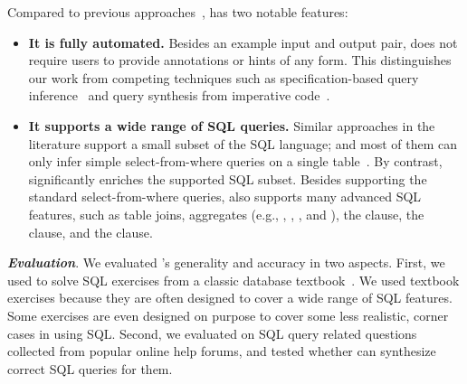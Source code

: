 Compared to previous approaches~\cite{Zloof:1975,
Tran:2009, DasSarma:2010, abs-1208-2013}, \ourtool has two notable features:

\begin{itemize}
\item \textbf{It is fully automated.} Besides
an example input and output pair,
\ourtool does not require users to provide
annotations or hints of any form. 
This distinguishes our work from competing techniques such as
specification-based query inference~\cite{Zloof:1975} and
query synthesis from imperative code~\cite{abs-1208-2013}.

\item \textbf{It supports a wide range of SQL queries.}
Similar approaches in the literature support
a small subset of the SQL language; and most of them
can only infer simple select-from-where
queries on a single table~\cite{Zloof:1975, DasSarma:2010, Tran:2009, DasSarma:2010, abs-1208-2013}. By contrast, 
\ourtool significantly enriches the supported SQL subset.
Besides supporting the standard select-from-where
queries, \ourtool also supports many advanced
SQL features, such as table joins,
aggregates (e.g., , , ,
and ), the  clause,
the  clause, and the  clause.
\end{itemize}






\vspace{1mm}
\noindent \textbf{\textit{Evaluation}}.
We evaluated \ourtool's generality and accuracy
in two aspects. First, we used \ourtool to solve
\exnum SQL exercises from a classic database textbook~\cite{cowbook}. 
We used textbook exercises because they
are often designed to cover a wide range of SQL features.
Some exercises are even designed on purpose to cover some less realistic,
corner cases in using SQL.
Second, we evaluated \ourtool on \exnum SQL query related
questions collected from popular online help forums, and tested whether
\ourtool can synthesize correct SQL queries for them.

